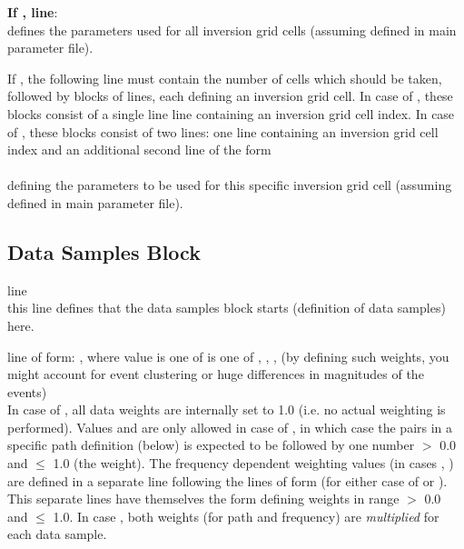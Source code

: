 {\bf If , line}: \\
defines the parameters used for all inversion grid cells (assuming  defined in main parameter file).

If , the following line must contain the number of cells  
which should be taken, followed by  blocks of lines, each defining an inversion grid cell. In case
of , these blocks consist of a single line line containing an inversion grid cell index.
In case of , these blocks consist of two lines: one line containing an inversion grid cell
index and an additional second line of the form\\
 \\
defining the parameters to be used for this specific inversion grid cell (assuming  defined in main parameter file).

\subsection{Data Samples Block}
line \\
this line defines that the data samples block starts (definition of data samples) here. 

line of form: , where value is one of is one of , , 
,  (by defining such weights, you might account for event clustering or huge differences in magnitudes of the events) \\
In case of , all data weights are internally set to 1.0 (i.e. no actual weighting is performed).
Values  and  are only allowed in case of , in which case
the pairs  in a specific path definition (below) is expected to be followed by one number $>$ 0.0 and $\le$ 1.0 (the weight).
The frequency dependent weighting values (in cases , ) are defined
in a separate line following the lines of form  (for either case of 
or ). This separate lines have themselves the form  defining  weights
in range $>$ 0.0 and $\le$ 1.0. 
In case , both weights (for path and frequency) are \emph{multiplied} for each data sample.

